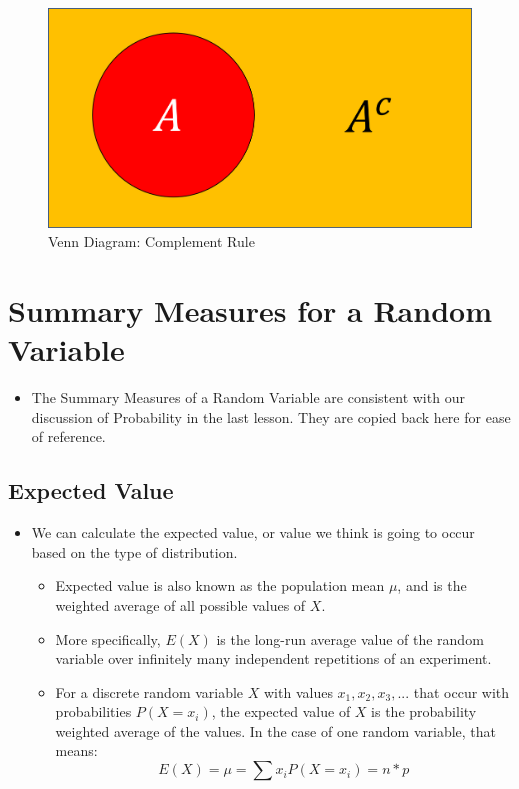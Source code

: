 \documentclass[
  letterpaper,
  DIV=11,
  numbers=noendperiod]{scrreprt}
\providecommand{\tightlist}{%
  \setlength{\itemsep}{0pt}\setlength{\parskip}{0pt}}\usepackage{longtable,booktabs,array}
\begin{document}
\begin{figure}[H]

{\centering \includegraphics{Pictures/Ch5/Venn3.png}

}

\caption{Venn Diagram: Complement Rule}

\end{figure}%

\section{Summary Measures for a Random
Variable}\label{summary-measures-for-a-random-variable-1}

\begin{itemize}
\tightlist
\item
  The Summary Measures of a Random Variable are consistent with our
  discussion of Probability in the last lesson. They are copied back
  here for ease of reference.
\end{itemize}

\subsection{Expected Value}\label{expected-value-1}

\begin{itemize}
\tightlist
\item
  We can calculate the expected value, or value we think is going to
  occur based on the type of distribution.

  \begin{itemize}
  \tightlist
  \item
    Expected value is also known as the population mean \(\mu\), and is
    the weighted average of all possible values of \(X\).
  \item
    More specifically, \(E(X)\) is the long-run average value of the
    random variable over infinitely many independent repetitions of an
    experiment.
  \item
    For a discrete random variable \(X\) with values
    \(x_1, x_2, x_3, ...\) that occur with probabilities \(P(X=x_i)\),
    the expected value of \(X\) is the probability weighted average of
    the values. In the case of one random variable, that means:
    \[E(X) = \mu = \sum{x_iP(X=x_i)} = n*p\]
  \end{itemize}
\end{itemize}
\end{document}
